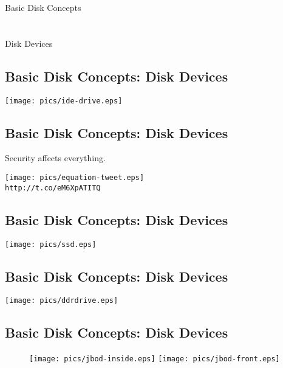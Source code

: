 \documentclass[xga]{xdvislides}
\begin{document}
\newpage
\vspace*{\fill}
\begin{center}
	\Hugesize
		Basic Disk Concepts \\ [1em]
	\hspace*{5mm}
	\blueline\\
	\hspace*{5mm}\\
		Disk Devices
\end{center}
\vspace*{\fill}


\subsection{Basic Disk Concepts: Disk Devices}
	\begin{center}
		\texttt{[image: pics/ide-drive.eps]} \\
	\end{center}

\subsection{Basic Disk Concepts: Disk Devices}
Security affects everything. \\
\begin{center}
	\texttt{[image: pics/equation-tweet.eps]} \\
	\verb+http://t.co/eM6XpATITQ+
\end{center}

\subsection{Basic Disk Concepts: Disk Devices}
	\begin{center}
		\texttt{[image: pics/ssd.eps]} \\
	\end{center}

\subsection{Basic Disk Concepts: Disk Devices}
	\begin{center}
		\texttt{[image: pics/ddrdrive.eps]} \\
	\end{center}

\subsection{Basic Disk Concepts: Disk Devices}
\begin{figure}[hb]
	\begin{center}
		\texttt{[image: pics/jbod-inside.eps]}
		\hspace*{15mm}
		\texttt{[image: pics/jbod-front.eps]} \\
	\end{center}
\end{figure}
\end{document}
